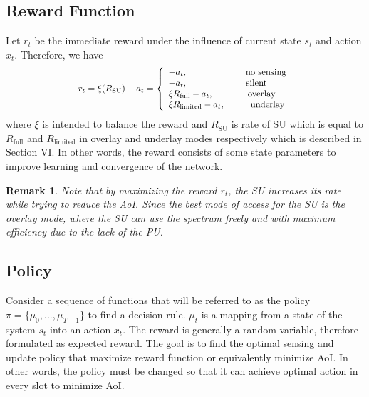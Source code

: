 \documentclass[journal]{IEEEtran}
\newtheorem{remark}{Remark}
\begin{document}
		\subsection{Reward Function}
			Let $r_t$ be the immediate reward under the influence of current state $s_t$ and action $x_t$. Therefore, we have
			\begin{equation}
				\scalebox{0.9} {${r_t} = \xi ({R_{\text{SU}}}) - {a_t} = \left\{ \begin{array}{l}
					- {a_t}, \hspace{2.28cm} \text{no~sensing}\\
					- {a_t}, \hspace{2.3cm} \text{silent}\\
					\xi {R_{\text{full}}} - {a_t}, \hspace{1.35cm} \text{overlay}\\
					\xi {R_{\text{limited}}} - {a_t}, \hspace{1cm} \text{underlay}
				\end{array} \right.$}
			\end{equation}
			where $\xi$ is intended to balance the reward and ${R_{\text{SU}}}$ is rate of SU which is equal to $R_{\text{full}}$ and $R_{\text{limited}}$ in overlay and underlay modes respectively which is described in Section VI. In other words, the reward consists of some state parameters to improve learning and convergence of the network.
			\begin{remark}
				Note that by maximizing the reward $r_t$, the SU increases its rate while trying to reduce the AoI. Since the best mode of access for the SU is the overlay mode, where the SU can use the spectrum freely and with maximum efficiency due to the lack of the PU.
			\end{remark}
		\subsection{Policy}
			Consider a sequence of functions that will be referred to as the policy $\pi=\{\mu_0,..., \mu_{T-1}\}$ to find a decision rule. $\mu_t$ is a mapping from a state of the system ${s_t}$ into an action ${x_t}$. The reward is generally a random variable, therefore formulated as expected reward. The goal is to find the optimal sensing and update policy that maximize reward function or equivalently minimize AoI. In other words, the policy must be changed so that it can achieve optimal action in every slot to minimize AoI.
\end{document}
